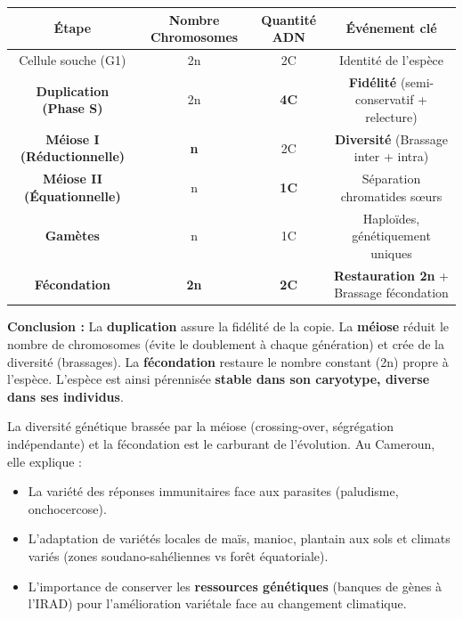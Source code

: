 \documentclass[11pt]{article}
\begin{document}
\begin{aretenir}
\begin{center}
\begin{tabular}{|c|c|c|c|}\hline
\textbf{Étape} & \textbf{Nombre Chromosomes} & \textbf{Quantité ADN} & \textbf{Événement clé} \\ \hline
Cellule souche (G1) & 2n & 2C & Identité de l'espèce \\ \hline
\textbf{Duplication (Phase S)} & 2n & \textbf{4C} & \textbf{Fidélité} (semi-conservatif + relecture) \\ \hline
\textbf{Méiose I (Réductionnelle)} & \textbf{n} & 2C & \textbf{Diversité} (Brassage inter + intra) \\ \hline
\textbf{Méiose II (Équationnelle)} & n & \textbf{1C} & Séparation chromatides sœurs \\ \hline
\textbf{Gamètes} & n & 1C & Haploïdes, génétiquement uniques \\ \hline
\textbf{Fécondation} & \textbf{2n} & \textbf{2C} & \textbf{Restauration 2n} + Brassage fécondation \\ \hline
\end{tabular}
\end{center}
\textbf{Conclusion :} La \textbf{duplication} assure la fidélité de la copie. La \textbf{méiose} réduit le nombre de chromosomes (évite le doublement à chaque génération) et crée de la diversité (brassages). La \textbf{fécondation} restaure le nombre constant (2n) propre à l'espèce. L'espèce est ainsi pérennisée \textbf{stable dans son caryotype, diverse dans ses individus}.
\end{aretenir}

\begin{savaistu}
La diversité génétique brassée par la méiose (crossing-over, ségrégation indépendante) et la fécondation est le carburant de l'évolution. Au Cameroun, elle explique :
\begin{itemize}
    \item La variété des réponses immunitaires face aux parasites (paludisme, onchocercose).
    \item L'adaptation de variétés locales de maïs, manioc, plantain aux sols et climats variés (zones soudano-sahéliennes vs forêt équatoriale).
    \item L'importance de conserver les \textbf{ressources génétiques} (banques de gènes à l'IRAD) pour l'amélioration variétale face au changement climatique.
\end{itemize}
\end{savaistu}
\end{document}
